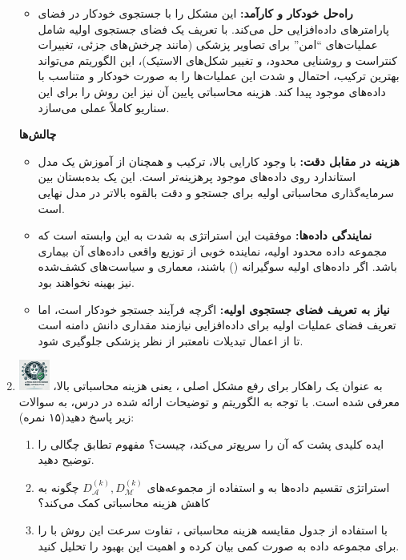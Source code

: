 \documentclass[12pt]{article}
\begin{document}
\begin{enumerate}
{\begin{itemize}
            \item \textbf{راه‌حل خودکار و کارآمد:}  
             این مشکل را با جستجوی خودکار در فضای پارامترهای داده‌افزایی حل می‌کند. با تعریف یک فضای جستجوی اولیه شامل عملیات‌های ``امن'' برای تصاویر پزشکی (مانند چرخش‌های جزئی، تغییرات کنتراست و روشنایی محدود، و تغییر شکل‌های الاستیک)، این الگوریتم می‌تواند بهترین ترکیب، احتمال و شدت این عملیات‌ها را به صورت خودکار و متناسب با داده‌های موجود پیدا کند. هزینه محاسباتی پایین آن نیز این روش را برای این سناریو کاملاً عملی می‌سازد.
        \end{itemize}
        \textbf{چالش‌ها}
        \begin{itemize}
            \item \textbf{هزینه در مقابل دقت:}  
            با وجود کارایی بالا، ترکیب  و  همچنان از آموزش یک مدل استاندارد روی داده‌های موجود پرهزینه‌تر است. این یک بده‌بستان بین سرمایه‌گذاری محاسباتی اولیه برای جستجو و دقت بالقوه بالاتر در مدل نهایی است.
            \item \textbf{نمایندگی داده‌ها:}  
            موفقیت این استراتژی به شدت به این وابسته است که مجموعه داده محدود اولیه، نماینده خوبی از توزیع واقعی داده‌های آن بیماری باشد. اگر داده‌های اولیه سوگیرانه () باشند، معماری و سیاست‌های کشف‌شده نیز بهینه نخواهند بود.
            \item \textbf{نیاز به تعریف فضای جستجوی اولیه:}  
            اگرچه فرآیند جستجو خودکار است، اما تعریف فضای عملیات اولیه برای داده‌افزایی نیازمند مقداری دانش دامنه است تا از اعمال تبدیلات نامعتبر از نظر پزشکی جلوگیری شود.
        \end{itemize}
    }
        
    \item \includegraphics[width=1cm]{figs/Allowed_recommended.jpg} به عنوان یک راهکار برای رفع مشکل اصلی ، یعنی هزینه محاسباتی بالا، معرفی شده است. با توجه به الگوریتم و توضیحات ارائه شده در درس، به سوالات زیر پاسخ دهید(۱۵ نمره):
    \begin{enumerate}
        \item ایده کلیدی پشت  که آن را سریع‌تر می‌کند، چیست؟ مفهوم 
تطابق چگالی را توضیح دهید.
        \item استراتژی تقسیم داده‌ها به  و استفاده از مجموعه‌های $D_{\mathcal{A}}^{(k)}, D_{\mathcal{M}}^{(k)}$ چگونه به کاهش هزینه محاسباتی کمک می‌کند؟
        \item با استفاده از جدول مقایسه هزینه محاسباتی ، تفاوت سرعت این روش با  را برای مجموعه داده  به صورت کمی بیان کرده و اهمیت این بهبود را تحلیل کنید.
    \end{enumerate}


\end{enumerate}
\end{document}
